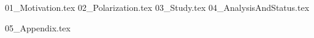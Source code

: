 \documentclass[aspectratio=\BeamerAspectRatio]{beamer}
\begin{document}
\maketitlepage
\maketableofcontents
\makesectionpopup

{01_Motivation.tex}
{02_Polarization.tex}
{03_Study.tex}
{04_AnalysisAndStatus.tex}

\appendix
\AtBeginSection[]{}
{05_Appendix.tex}
\end{document}
